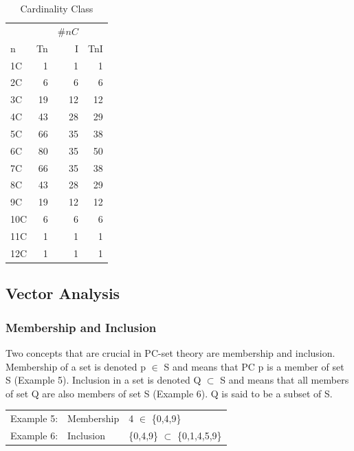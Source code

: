 \documentclass{article}
\begin{document}
\begin{table}[htb]
\caption{Cardinality Class} 
\begin{center}
\begin{tabular}{lrrr}
      &      &  $\#nC$  &       \\
 n    &  Tn  &       I  &  TnI  \\
\hline
 1C   &   1  &       1  &    1  \\
 2C   &   6  &       6  &    6  \\
 3C   &  19  &      12  &   12  \\
 4C   &  43  &      28  &   29  \\
 5C   &  66  &      35  &   38  \\
 6C   &  80  &      35  &   50  \\
 7C   &  66  &      35  &   38  \\
 8C   &  43  &      28  &   29  \\
 9C   &  19  &      12  &   12  \\
 10C  &   6  &       6  &    6  \\
 11C  &   1  &       1  &    1  \\
 12C  &   1  &       1  &    1  \\
\end{tabular}
\end{center}
\end{table}
\subsection{Vector Analysis}
\label{sec-3-3}
\subsubsection{Membership and Inclusion}
\label{sec-3-3-1}

Two concepts that are crucial in PC-set theory are membership and
inclusion. Membership of a set is denoted p $\in$ S and means that PC p
is a member of set S (Example 5). Inclusion in a set is denoted Q
$\subset$ S and means that all members of set Q are also members of set
S (Example 6). Q is said to be a subset of S.

\begin{center}
\begin{tabular}{lll}
 Example 5:  &  Membership  &  4 $\in$ \{0,4,9\}                  \\
 Example 6:  &  Inclusion   &  \{0,4,9\} $\subset$ \{0,1,4,5,9\}  \\
\end{tabular}
\end{center}
\end{document}
